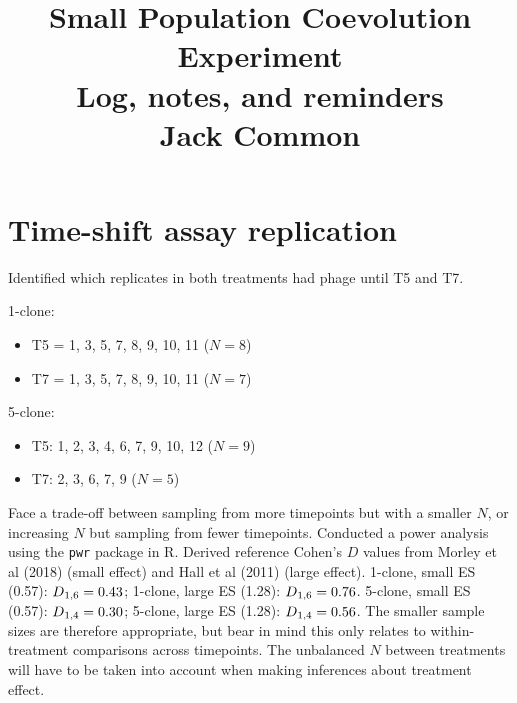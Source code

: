 \documentclass [12pt, a4paper, twoside]  {article}
\title{
	\raggedright
	\Huge{\textbf{Small Population Coevolution Experiment}}\\
	\Large{Log, notes, and reminders}\\
	\Large{Jack Common}\\
	\vspace{.5cm}
}
\date{\vspace{-12ex}}
\newcommand{\sub}{\textsubscript}
\begin{document}
\maketitle

\section*{Time-shift assay replication}
Identified which replicates in both treatments had phage until T5 and T7. 

1-clone:
\begin{itemize}
	\item T5 = 1, 3, 5, 7, 8, 9, 10, 11 ($N=8$)
	\item T7 = 1, 3, 5, 7, 8, 9, 10, 11 ($N=7$)
\end{itemize}

5-clone:
\begin{itemize}
	\item T5: 1, 2, 3, 4, 6, 7, 9, 10, 12 ($N=9$)
	\item T7: 2, 3, 6, 7, 9 ($N=5$)
\end{itemize}

Face a trade-off between sampling from more timepoints but with a smaller $N$, or increasing $N$ but sampling from fewer timepoints. Conducted a power analysis using the \texttt{pwr} package in R. Derived reference Cohen's $D$ values from Morley et al (2018) (small effect) and Hall et al (2011) (large effect). 1-clone, small ES (0.57): $D\sub{1,6}=0.43$; 1-clone, large ES (1.28): $D\sub{1,6}=0.76$. 5-clone, small ES (0.57): $D\sub{1,4}=0.30$; 5-clone, large ES (1.28): $D\sub{1,4}=0.56$.
The smaller sample sizes are therefore appropriate, but bear in mind this only relates to within-treatment comparisons across timepoints. The unbalanced $N$ between treatments will have to be taken into account when making inferences about treatment effect. 
\end{document}
